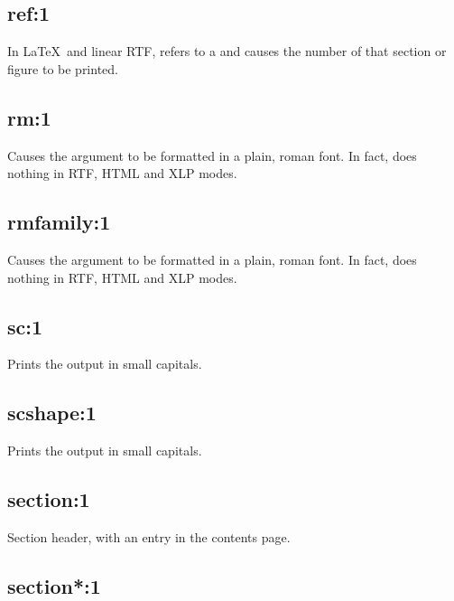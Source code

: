 \subsection*{ref:1}\label{ref}

In \LaTeX\ and linear RTF, refers to a  and
causes the number of that section or figure to be printed.

\subsection*{rm:1}\label{rm}

Causes the argument to be formatted in a plain, roman font.
In fact, does nothing in RTF, HTML and XLP modes.

\subsection*{rmfamily:1}\label{rmfamily}

Causes the argument to be formatted in a plain, roman font.
In fact, does nothing in RTF, HTML and XLP modes.


\subsection*{sc:1}\label{sc}

Prints the output in small capitals.

\subsection*{scshape:1}\label{scshape}

Prints the output in small capitals.

\subsection*{section:1}\label{section}

Section header, with an entry in the contents page.

\subsection*{section*:1}\label{sectionX}

